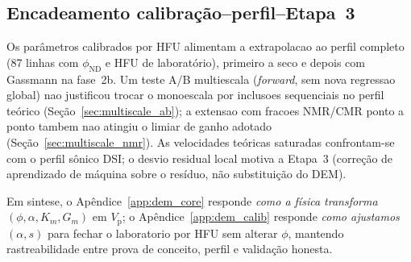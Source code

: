 \documentclass[11pt,a4paper]{article}
\numberwithin{equation}{section}
\newcommand{\phiND}{\ensuremath{\phi_{\mathrm{ND}}}}
\newcommand{\Vp}{\ensuremath{V_{\mathrm{p}}}}
\begin{document}
\subsection{Encadeamento calibração--perfil--Etapa~3}

Os parâmetros calibrados por HFU alimentam a extrapolacao ao perfil completo
(87 linhas com \phiND{} e HFU de laboratório), primeiro a seco e depois com
Gassmann na fase~2b.
Um teste A/B multiescala (\emph{forward}, sem nova regressao global) nao
justificou trocar o monoescala por inclusoes sequenciais no perfil teórico
(Seção~\ref{sec:multiscale_ab}); a extensao com fracoes NMR/CMR ponto a ponto
tambem nao atingiu o limiar de ganho adotado (Seção~\ref{sec:multiscale_nmr}).
As velocidades teóricas saturadas confrontam-se com o perfil sônico DSI; o
desvio residual local motiva a Etapa~3 (correção de aprendizado de máquina
sobre o resíduo, não substituição do DEM).

Em sintese, o Apêndice~\ref{app:dem_core} responde \emph{como a física
transforma} $(\phi,\alpha,K_m,G_m)$ em \Vp; o Apêndice~\ref{app:dem_calib}
responde \emph{como ajustamos} $(\alpha,s)$ para fechar o laboratorio por HFU
sem alterar $\phi$, mantendo rastreabilidade entre prova de conceito, perfil
e validação honesta.
\end{document}
